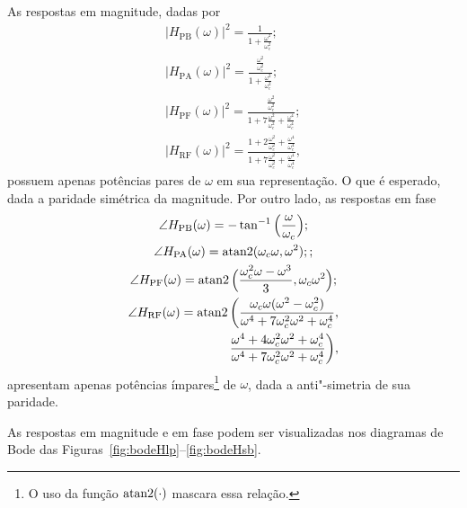 As respostas em magnitude, dadas por
\begin{gather}
	|H_{\text{PB}}(\omega)|^2=\frac{1}{\displaystyle1+\frac{\omega^2}{\omega_c^2}};\\
	|H_{\text{PA}}(\omega)|^2=\frac{\displaystyle\frac{\omega^2}{\omega_c^2}}{\displaystyle1+\frac{\omega^2}{\omega_c^2}};\\
	|H_{\text{PF}}(\omega)|^2=\frac{\displaystyle\frac{\omega^2}{\omega_c^2}}{\displaystyle1+7\frac{\omega^2}{\omega_c^2}+\frac{\omega^4}{\omega_c^4}};\\
	|H_{\text{RF}}(\omega)|^2=\frac{\displaystyle1+2\frac{\omega^2}{\omega_c^2}+\frac{\omega^4}{\omega_c^4}}{\displaystyle1+7\frac{\omega^2}{\omega_c^2}+\frac{\omega^4}{\omega_c^4}},
\end{gather}
possuem apenas potências pares de $\omega$ em sua representação. O que é esperado, dada a paridade simétrica da magnitude. Por outro lado, as respostas em fase
\begin{gather}
	\angle H_{\text{PB}}(\omega)=-\tan^{-1}\Big(\frac{\omega}{\omega_c}\Big);\\
	\angle H_{\text{PA}}(\omega)=\operatorname{atan2}(\omega_c\omega,\omega^2);;\\
	\angle H_{\text{PF}}(\omega)=\operatorname{atan2}\Big(\frac{\omega_c^2\omega-\omega^3}{3},\omega_c\omega^2\Big);\\
	\begin{aligned}
	\angle H_{\text{RF}}(\omega)=\operatorname{atan2}\bigg(\frac{\omega_c\omega(\omega^2-\omega_c^2)}{\omega^4+7\omega_c^2\omega^2+\omega_c^4},\\\frac{\omega^4+4\omega_c^2\omega^2+\omega_c^4}{\omega^4+7\omega_c^2\omega^2+\omega_c^4}\bigg),\end{aligned}
\end{gather}
apresentam apenas potências ímpares\footnote{O uso da função $\operatorname{atan2}(\cdot)$ mascara essa relação.} de $\omega$, dada a anti"-simetria de sua paridade.

As respostas em magnitude e em fase podem ser visualizadas nos diagramas de Bode das Figuras~\ref{fig:bodeHlp}--\ref{fig:bodeHsb}.

